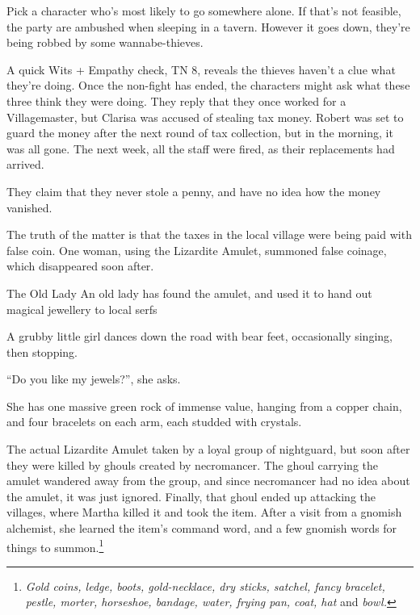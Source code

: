 \begin{multicols}{2}
Pick a character who's most likely to go somewhere alone.  If that's not feasible, the party are ambushed when sleeping in a tavern.
However it goes down, they're being robbed by some wannabe-thieves.

A quick Wits + Empathy check, TN 8, reveals the thieves haven't a clue what they're doing.
Once the non-fight has ended, the characters might ask what these three think they were doing.
They reply that they once worked for a Villagemaster, but Clarisa was accused of stealing tax money.
Robert was set to guard the money after the next round of tax collection, but in the morning, it was all gone.
The next week, all the staff were fired, as their replacements had arrived.

They claim that they never stole a penny, and have no idea how the money vanished.

The truth of the matter is that the taxes in the local village were being paid with false coin.
One woman, using the Lizardite Amulet, summoned false coinage, which disappeared soon after.



{The Old Lady}%
{An old lady has found the amulet, and used it to hand out magical jewellery to local serfs}%

\begin{boxtext}
	A grubby little girl dances down the road with bear feet, occasionally singing, then stopping.

		``Do you like my jewels?'', she asks.

	She has one massive green rock of immense value, hanging from a copper chain, and four bracelets on each arm, each studded with crystals.
\end{boxtext}

The actual Lizardite Amulet taken by a loyal group of \gls{nightguard}, but soon after they were killed by ghouls created by \gls{necromancer}.
The ghoul carrying the amulet wandered away from the group, and since \gls{necromancer} had no idea about the amulet, it was just ignored.
Finally, that ghoul ended up attacking the villages, where Martha killed it and took the item.
After a visit from a gnomish alchemist, she learned the item's command word, and a few gnomish words for things to summon.\footnote
{\textit{Gold coins, ledge, boots, gold-necklace, dry sticks, satchel, fancy bracelet, pestle, morter, horseshoe, bandage, water, frying pan, coat, hat} and \textit{bowl.}}


\end{multicols}

